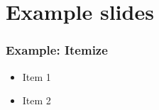\section{Example slides}

    \begin{frame}
        \frametitle{}

    \end{frame}


    \begin{frame}
        \frametitle{Example: Itemize}

        \begin{itemize}
            \item Item 1
            \item Item 2
        \end{itemize}

    \end{frame}

